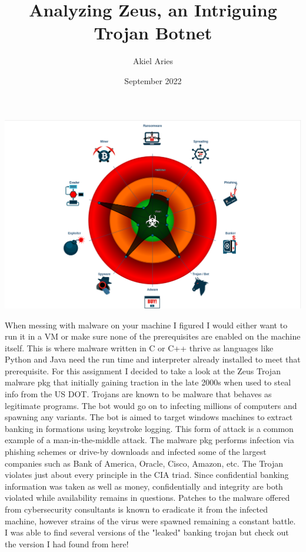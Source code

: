 \documentclass[12pt, letterpaper]{article}
\title{Analyzing Zeus, an Intriguing Trojan Botnet}
\author{Akiel Aries}
\date{September 2022}
\begin{document}
\maketitle

\includegraphics[scale=0.3]{ZEUS_CLASSIFICATION.png}


When messing with malware on your machine I figured I would either want 
to run it in a VM or make sure none of the prerequisites are enabled on
the machine itself. This is where malware written in C or C++ thrive as
languages like Python and Java need the run time and interpreter already
installed to meet that prerequisite. For this assignment I decided to
take a look at the Zeus Trojan malware pkg that initially gaining
traction in the late 2000s when used to steal info from the US DOT.
Trojans are known to be malware that behaves as legitimate programs. The
bot would go on to infecting millions of computers and spawning any
variants. The bot is aimed to target windows machines to extract banking
in formations using keystroke logging. This form of attack is a common
example of a man-in-the-middle attack. The malware pkg performs
infection via phishing schemes or drive-by downloads and infected some
of the largest companies such as Bank of America, Oracle, Cisco, Amazon,
etc. The Trojan violates just about every principle in the CIA triad.
Since confidential banking information was taken as well as money,
confidentially and integrity are both violated while availability
remains in questions. Patches to the malware offered from cybersecurity
consultants is known to eradicate it from the infected machine, however
strains of the virus were spawned remaining a constant battle.
I was able to find several versions of the "leaked" banking trojan but
check out the version I had found from here!
\end{document}
